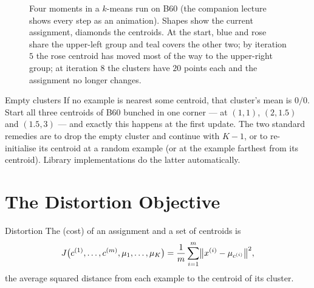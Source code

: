 \begin{figure}[htbp]
  \caption{Four moments in a $k$-means run on B60 (the companion lecture shows
  every step as an animation). Shapes show the current assignment, diamonds the
  centroids. At the start, blue and rose share the upper-left group and teal
  covers the other two; by iteration $5$ the rose centroid has moved most of the
  way to the upper-right group; at iteration $8$ the clusters have $20$ points
  each and the assignment no longer changes.}
  \label{fig:b60-strip}
\end{figure}

\begin{pitfall}{Empty clusters}
If no example is nearest some centroid, that cluster's mean is $0/0$. Start all
three centroids of B60 bunched in one corner --- at $(1,1)$, $(2,1.5)$ and
$(1.5,3)$ --- and exactly this happens at the first update. The two standard
remedies are to drop the empty cluster and continue with $K-1$, or to
re-initialise its centroid at a random example (or at the example farthest from
its centroid). Library implementations do the latter automatically.
\end{pitfall}

\section{The Distortion Objective}
\label{sec:distortion}

\begin{defbox}{Distortion}
The  (cost) of an assignment and a set of centroids is
\[
  J\bigl(c^{(1)},\dots,c^{(m)},\mu_1,\dots,\mu_K\bigr)
  = \frac1m\sum_{i=1}^{m}\bigl\|x^{(i)} - \mu_{c^{(i)}}\bigr\|^2 ,
\]
the average squared distance from each example to the centroid of its cluster.
\end{defbox}

